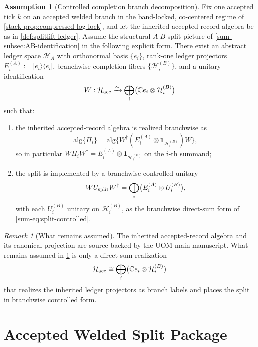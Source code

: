 \documentclass[11pt]{article}
\theoremstyle{definition}
\newtheorem{assumption}[definition]{Assumption}
\theoremstyle{plain}
\theoremstyle{remark}
\newtheorem{remark}[definition]{Remark}
\newcommand{\Hacc}{\mathcal H_{\rm acc}}
\newcommand{\HA}{\mathcal H_A}
\newcommand{\1}{\mathbf 1}
\begin{document}
\begin{assumption}[Controlled completion branch decomposition]
\label{ass:splitlift-controlled}
Fix one accepted tick \(k\) on an accepted welded branch in the band-locked, co-centered regime of
\cref{stack-prop:compressed-log-lock}, and let the inherited accepted-record algebra be as in
\cref{def:splitlift-ledger}.
Assume the structural \(A|B\) split picture of \cref{sum-subsec:AB-identification} in the following
explicit form.
There exist an abstract ledger space \(\HA\) with orthonormal basis \(\{e_i\}\), rank-one ledger
projectors \(E_i^{(A)}:=|e_i\rangle\langle e_i|\), branchwise completion fibers
\(\{\mathcal H_i^{(B)}\}\), and a unitary identification
\[
W:\Hacc \xrightarrow{\sim} \bigoplus_i \bigl(\mathbb C e_i \otimes \mathcal H_i^{(B)}\bigr)
\]
such that:
\begin{enumerate}[leftmargin=2em]
\item the inherited accepted-record algebra is realized branchwise as
  \[
  \mathrm{alg}\{\Pi_i\}
  =
  \mathrm{alg}\{W^\dagger(E_i^{(A)}\otimes \1_{\mathcal H_i^{(B)}})W\},
  \]
  so in particular \(W\Pi_iW^\dagger=E_i^{(A)}\otimes \1_{\mathcal H_i^{(B)}}\) on the \(i\)-th
  summand;
\item the split is implemented by a branchwise controlled unitary
  \[
  WU_{\rm split}W^\dagger
  =
  \bigoplus_i \bigl(E_i^{(A)}\otimes U_i^{(B)}\bigr),
  \]
  with each \(U_i^{(B)}\) unitary on \(\mathcal H_i^{(B)}\), as the branchwise direct-sum form of
  \eqref{sum-eq:split-controlled}.
\end{enumerate}
\end{assumption}

\begin{remark}[What remains assumed]
\label{rem:splitlift-open-structure}
The inherited accepted-record algebra and its canonical projection are source-backed by the UOM main
manuscript.
What remains assumed in \cref{ass:splitlift-controlled} is only a direct-sum realization
\[
\Hacc \cong \bigoplus_i \bigl(\mathbb C e_i\otimes \mathcal H_i^{(B)}\bigr)
\]
that realizes the inherited ledger projectors as branch labels and places the split in branchwise
controlled form.
\end{remark}

\section{Accepted Welded Split Package}
\label{sec:splitlift-data}
\end{document}
